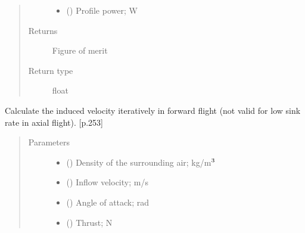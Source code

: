 \documentclass[letterpaper,10pt,english]{sphinxmanual}
\begin{document}
\begin{fulllineitems}
\begin{fulllineitems}
\begin{quote}
\begin{description}
\begin{itemize}
\item {} 
\sphinxAtStartPar
{} () \textendash{} Profile power; W

\end{itemize}

\item[{Returns}] \leavevmode
\sphinxAtStartPar
Figure of merit

\item[{Return type}] \leavevmode
\sphinxAtStartPar
float

\end{description}\end{quote}

\end{fulllineitems}


\begin{fulllineitems}
\label{\detokenize{modules/rotor:rotor.Rotor.get_induced_velocity}}
\sphinxAtStartPar
Calculate the induced velocity iteratively in forward flight (not valid
for low sink rate in axial flight). {[}p.253{]}
\begin{quote}\begin{description}
\item[{Parameters}] \leavevmode\begin{itemize}
\item {} 
\sphinxAtStartPar
{} () \textendash{} Density of the surrounding air; kg/m\(\sp{\text{3}}\)

\item {} 
\sphinxAtStartPar
{} () \textendash{} Inflow velocity; m/s

\item {} 
\sphinxAtStartPar
{} () \textendash{} Angle of attack; rad

\item {} 
\sphinxAtStartPar
{} () \textendash{} Thrust; N


\end{itemize}
\end{description}
\end{quote}
\end{fulllineitems}
\end{fulllineitems}
\end{document}
